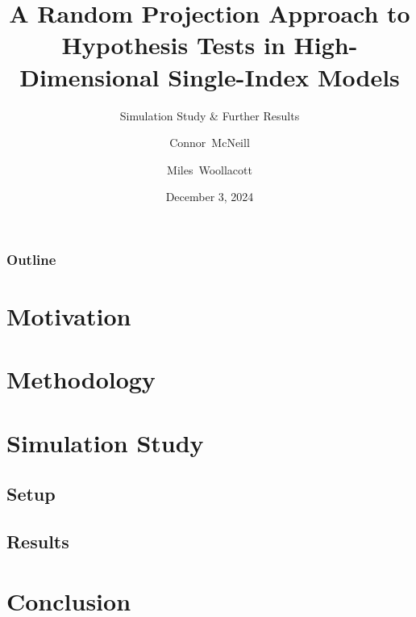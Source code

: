 \documentclass{beamer}
\title[ST 793 Final Project]{A Random Projection Approach to Hypothesis Tests in High-Dimensional Single-Index Models}
\subtitle{Simulation Study \& Further Results}
\author[McNeill and Woollacott]{Connor~McNeill\inst{*} \and Miles~Woollacott\inst{*}}
\institute[NCSU]{\inst{*}Department of Statistics, North Carolina State University}
\date{December 3, 2024}
\begin{document}
\frame{\titlepage}

\begin{frame}
    \frametitle{Outline}
    \tableofcontents
\end{frame}

\section{Motivation}

\begin{frame}

\end{frame}

\section{Methodology}

\begin{frame}

\end{frame}

\section{Simulation Study}

\subsection{Setup}
\begin{frame}

\end{frame}
\subsection{Results}
\begin{frame}

\end{frame}

\section{Conclusion}
\begin{frame}

\end{frame}
\end{document}
